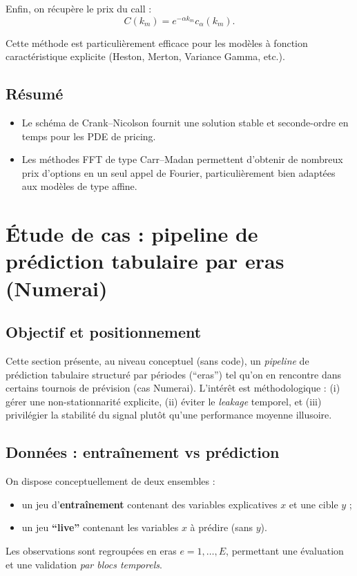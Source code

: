 \documentclass[11pt,a4paper]{article}
\newcommand{\1}{\mathbf{1}}
\begin{document}
Enfin, on récupère le prix du call :
\[
C(k_m) = e^{-\alpha k_m} c_\alpha(k_m).
\]

Cette m\'ethode est particulièrement efficace pour les mod\`eles à fonction
caract\'eristique explicite (Heston, Merton, Variance Gamma, etc.).

\subsection*{Résumé}

\begin{itemize}
  \item Le schéma de Crank--Nicolson fournit une solution stable et seconde-ordre
        en temps pour les PDE de pricing.
  \item Les méthodes FFT de type Carr--Madan permettent d'obtenir de nombreux prix
        d'options en un seul appel de Fourier, particulièrement bien adaptées aux
        mod\`eles de type affine.
\end{itemize}

\section{\'Etude de cas : pipeline de pr\'ediction tabulaire par eras (Numerai)}
\label{sec:case-numerai}

\subsection*{Objectif et positionnement}
Cette section pr\'esente, au niveau conceptuel (sans code), un \emph{pipeline} de pr\'ediction tabulaire structur\'e par p\'eriodes (``eras'') tel
qu'on en rencontre dans certains tournois de pr\'evision (cas Numerai). L'int\'er\^et est m\'ethodologique : (i) g\'erer une non-stationnarit\'e
explicite, (ii) \'eviter le \emph{leakage} temporel, et (iii) privil\'egier la stabilit\'e du signal plut\^ot qu'une performance moyenne illusoire.

\subsection*{Donn\'ees : entra\^{i}nement vs pr\'ediction}
On dispose conceptuellement de deux ensembles :
\begin{itemize}
  \item un jeu d'\textbf{entra\^{i}nement} contenant des variables explicatives $x$ et une cible $y$ ;
  \item un jeu \textbf{``live''} contenant les variables $x$ \`a pr\'edire (sans $y$).
\end{itemize}
Les observations sont regroup\'ees en eras $e=1,\dots,E$, permettant une \'evaluation et une validation \emph{par blocs temporels}.
\end{document}
